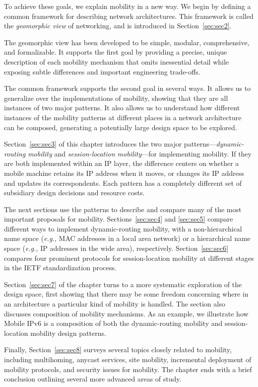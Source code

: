 \noindent
To achieve these goals,
we explain mobility in a new way.
We begin by defining a common framework for describing network
architectures.
This framework is
called the {\it geomorphic view} of networking, and is
introduced in
Section~\ref{sec:sec2}.

The geomorphic view has been developed to be simple, modular,
comprehensive, and formalizable.
It supports the first goal by providing a precise, unique description
of each mobility mechanism
that omits inessential detail while exposing subtle differences
and important engineering trade-offs.

The common framework supports the second goal in several ways.
It allows us to generalize over the implementations of mobility,
showing that they are all instances of two major patterns.
It also allows us to understand how 
different instances of the mobility patterns at different places in a
network
architecture can be composed, generating a potentially large design
space to be explored.

Section~\ref{sec:sec3} of this chapter introduces the two major
patterns---\emph{dynamic-routing mobility}
and \emph{session-location mobility}---for implementing mobility.
If they are both implemented within an IP layer, the difference centers
on whether a mobile machine
retains its IP address when
it moves, or changes its IP address and updates its correspondents.
Each pattern has a completely different set of subsidiary design
decisions and resource costs.

The next sections 
use the patterns to describe and compare many of the most
important proposals for mobility.  
Sections~\ref{sec:sec4} and
\ref{sec:sec5} compare different ways to implement
dynamic-routing mobility,
with a non-hierarchical name space ({\it e.g.,}
MAC addresses in a local area
network) or a hierarchical name
space ({\it e.g.,} IP addresses in the wide
area), respectively.  
Section~\ref{sec:sec6} compares four prominent protocols for
session-location mobility at different stages in the IETF
standardization process.

Section~\ref{sec:sec7} of the chapter turns to
a more systematic exploration of the
design space, first showing that there may be some freedom concerning
where in an architecture a particular kind of mobility is handled.
The section also discusses composition of mobility
mechanisms.
As an example, we illustrate how Mobile IPv6 is a
composition of both the dynamic-routing mobility and session-location
mobility design patterns.

Finally, Section~\ref{sec:sec8} surveys several topics closely
related to mobility, including multihoming, anycast services, site
mobility, incremental deployment of mobility protocols, and security
issues for mobility.  
The chapter ends with a brief
conclusion outlining several more advanced areas of study.
